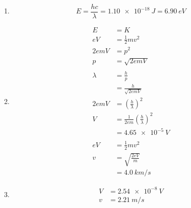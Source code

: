 \documentclass{article}
\begin{document}
\begin{enumerate}
  \item \[E = \frac{h c}{\lambda} = \qty{1.10e-18}{J} = \qty{6.90}{eV}\]

  \item

        \begin{align*}
          E       & = K                                                  \\
          e V     & = \frac{1}{2} m v^2                                  \\
          2 e m V & = p^2                                                \\
          p       & = \sqrt{2 e m V}                                     \\ \\
          \lambda & = \frac{h}{p}                                        \\
                  & = \frac{h}{\sqrt{2 e m V}}                           \\
          2 e m V & = \left( \frac{h}{\lambda} \right)^2                 \\
          V       & = \frac{1}{2 e m} \left( \frac{h}{\lambda} \right)^2 \\
                  & = \qty{4.65e-5}{V}                                   \\ \\
          e V     & = \frac{1}{2} m v^2                                  \\
          v       & = \sqrt{\frac{2 e V}{m}}                             \\
                  & = \qty{4.0}{km/s}
        \end{align*}

  \item

        \begin{align*}
          V & = \qty{2.54e-8}{V} \\
          v & = \qty{2.21}{m/s}
        \end{align*}
\end{enumerate}

\setcounter{subsubsection}{66}
\subsubsection{}
\end{document}
